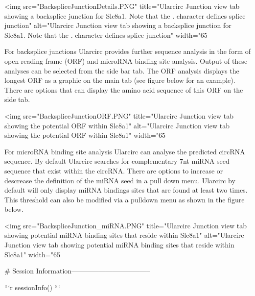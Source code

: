 <img src="BackspliceJunctionDetails.PNG" title="Ularcirc Junction view tab showing a backsplice junction for Slc8a1. Note that the . character defines splice junction" alt="Ularcirc Junction view tab showing a backsplice junction for Slc8a1. Note that the . character defines splice junction" width="65%

For backsplice junctions Ularcirc provides further sequence analysis in the form of open reading frame (ORF) and microRNA binding site analysis. Output of these analyses can be selected from the side bar tab. The ORF analysis displays the longest ORF as a graphic on the main tab (see figure below for an example). There are options that can display the amino acid sequence of this ORF on the side tab.

<img src="BackspliceJunctionORF.PNG" title="Ularcirc Junction view tab showing the potential ORF within Slc8a1" alt="Ularcirc Junction view tab showing the potential ORF within Slc8a1" width="65%

For microRNA binding site analysis Ularcirc can analyse the predicted circRNA sequence. By default Ularcirc searches for complementary 7nt miRNA seed sequence that exist within the circRNA. There are options to increase or descrease the definition of the miRNA seed in a pull down menu. Ularcirc by default will only display miRNA bindings sites that are found at least two times. This threshold can also be modified via a pulldown menu as shown in the figure below. 


<img src="BackspliceJunction_miRNA.PNG" title="Ularcirc Junction view tab showing potential miRNA binding sites that reside within Slc8a1" alt="Ularcirc Junction view tab showing potential miRNA binding sites that reside within Slc8a1" width="65%


# Session Information-----------------------------------


```r
sessionInfo()
```

